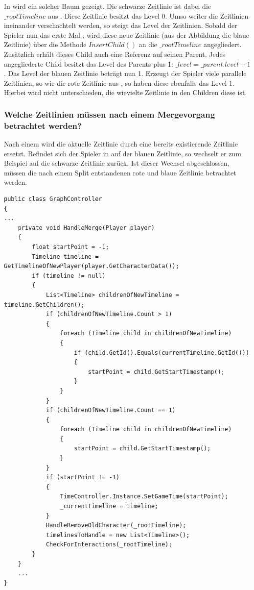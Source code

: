 In  wird ein solcher Baum gezeigt. Die schwarze Zeitlinie ist dabei die $\_rootTimeline$ aus . Diese Zeitlinie besitzt das Level 0. Umso weiter die Zeitlinien ineinander verschachtelt werden, so steigt das Level der Zeitlinien. Sobald der Spieler nun das erste Mal , wird diese neue Zeitlinie (aus der Abbildung die blaue Zeitlinie) über die Methode $InsertChild()$ an die $\_rootTimeline$ angegliedert. Zusätzlich erhält dieses Child auch eine Referenz auf seinen Parent. Jedes angegliederte Child besitzt das Level des Parents plus 1: $\_level = \_parent.level +1$. Das Level der blauen Zeitlinie beträgt nun 1. Erzeugt der Spieler viele parallele  Zeitlinien, so wie die rote Zeitlinie aus , so haben diese ebenfalls das Level 1. Hierbei wird nicht unterschieden, die wievielte Zeitlinie in den Children diese ist. 

\subsubsection{Welche Zeitlinien müssen nach einem Mergevorgang betrachtet werden?}\label{sec:good_02}
Nach einem  wird die aktuelle Zeitlinie durch eine bereits existierende Zeitlinie ersetzt. Befindet sich der Spieler in  auf der blauen Zeitlinie, so wechselt er zum Beispiel auf die schwarze Zeitlinie zurück. Ist dieser Wechsel abgeschlossen, müssen die nach einem Split entstandenen rote und blaue Zeitlinie betrachtet werden.

\begin{lstlisting}[caption={HandleMerge Methode aus dem alten Prototyp}, label={sec:old_merge}]
public class GraphController
{
...
    private void HandleMerge(Player player)
    {
        float startPoint = -1;
        Timeline timeline = GetTimelineOfNewPlayer(player.GetCharacterData());
        if (timeline != null)
        {
            List<Timeline> childrenOfNewTimeline = timeline.GetChildren();
            if (childrenOfNewTimeline.Count > 1)
            {
                foreach (Timeline child in childrenOfNewTimeline)
                {
                    if (child.GetId().Equals(currentTimeline.GetId()))
                    {
                        startPoint = child.GetStartTimestamp();
                    }
                }
            }
            if (childrenOfNewTimeline.Count == 1)
            {
                foreach (Timeline child in childrenOfNewTimeline)
                {
                    startPoint = child.GetStartTimestamp();
                }
            }
            if (startPoint != -1)
            {
                TimeController.Instance.SetGameTime(startPoint);
                _currentTimeline = timeline;
            }
            HandleRemoveOldCharacter(_rootTimeline);
            timelinesToHandle = new List<Timeline>();
            CheckForInteractions(_rootTimeline);
        }
    }
    ...
}
\end{lstlisting}


